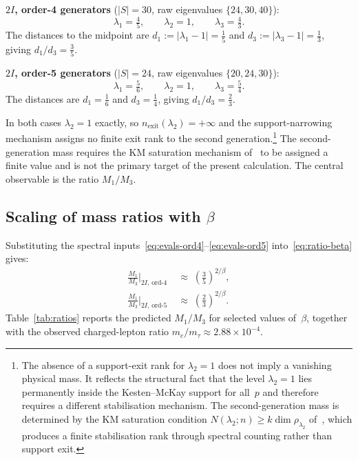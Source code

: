 \documentclass[11pt,a4paper]{article}
\newcommand{\nexit}{n_{\mathrm{exit}}}
\begin{document}
      \medskip
      \noindent
      \textbf{$2I$, order-4 generators} ($|S| = 30$, raw eigenvalues $\{24, 30, 40\}$):
      \begin{equation}
        \label{eq:evals-ord4}
        \lambda_1 = \tfrac{4}{5},
        \qquad
        \lambda_2 = 1,
        \qquad
        \lambda_3 = \tfrac{4}{3}.
      \end{equation}
      The distances to the midpoint are
      $d_1 := |\lambda_1 - 1| = \tfrac{1}{5}$ and
      $d_3 := |\lambda_3 - 1| = \tfrac{1}{3}$,
      giving $d_1/d_3 = \tfrac{3}{5}$.

      \medskip
      \noindent
      \textbf{$2I$, order-5 generators} ($|S| = 24$, raw eigenvalues $\{20, 24, 30\}$):
      \begin{equation}
        \label{eq:evals-ord5}
        \lambda_1 = \tfrac{5}{6},
        \qquad
        \lambda_2 = 1,
        \qquad
        \lambda_3 = \tfrac{5}{4}.
      \end{equation}
      The distances are
      $d_1 = \tfrac{1}{6}$ and $d_3 = \tfrac{1}{4}$,
      giving $d_1/d_3 = \tfrac{2}{3}$.

      \medskip
      \noindent
      In both cases $\lambda_2 = 1$ exactly, so $\nexit(\lambda_2) = +\infty$
      and the support-narrowing mechanism assigns no finite exit rank to the
      second generation.\footnote{%
    The absence of a support-exit rank for $\lambda_2 = 1$ does not imply
    a vanishing physical mass.
    It reflects the structural fact that the level $\lambda_2 = 1$ lies
    permanently inside the Kesten--McKay support for all~$p$ and therefore
    requires a different stabilisation mechanism.
    The second-generation mass is determined by the KM saturation condition
    $N(\lambda_2; n) \geq k \dim\rho_{\lambda_2}$ of~\cite{Beau2026a5},
    which produces a finite stabilisation rank through spectral counting
    rather than support exit.
  }
      The second-generation mass requires the KM saturation mechanism
      of~\cite{Beau2026a5} to be assigned a finite value
      and is not the primary target of the present calculation.
      The central observable is the ratio $M_1/M_3$.

    \subsection{Scaling of mass ratios with $\beta$}
      \label{subsec:scaling}

      Substituting the spectral inputs~\eqref{eq:evals-ord4}--\eqref{eq:evals-ord5}
      into~\eqref{eq:ratio-beta} gives:
      \begin{align}
        \label{eq:ratio-ord4}
        \frac{M_1}{M_3}\bigg|_{2I,\,\mathrm{ord\text{-}4}}
        &\;\approx\; \left(\tfrac{3}{5}\right)^{2/\beta},\\[6pt]
        \label{eq:ratio-ord5}
        \frac{M_1}{M_3}\bigg|_{2I,\,\mathrm{ord\text{-}5}}
        &\;\approx\; \left(\tfrac{2}{3}\right)^{2/\beta}.
      \end{align}
      Table~\ref{tab:ratios} reports the predicted $M_1/M_3$ for selected values
      of~$\beta$, together with the observed charged-lepton ratio
      $m_e/m_\tau \approx 2.88 \times 10^{-4}$.
\end{document}
